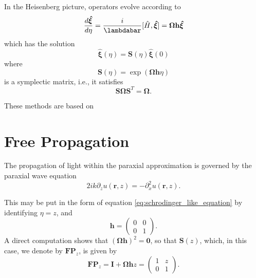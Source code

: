 \documentclass[a4paper,10pt]{report}
\begin{document}
In the Heisenberg picture, operators evolve according to
\begin{equation}
\frac{d\boldsymbol{\hat{\xi}}}{d\eta} = \frac{i}{\lambdabar} [\hat{H}, \boldsymbol{\hat{\xi}}] = \boldsymbol{\Omega} \mathbf{h} \boldsymbol{\hat{\xi}}
\end{equation}
which has the solution
\begin{equation}
\boldsymbol{\hat{\xi}}(\eta) = \mathbf{S}(\eta) \boldsymbol{\hat{\xi}}(0)
\end{equation}
where
\begin{equation}\mathbf{S}(\eta) = \exp(\boldsymbol{\Omega} \mathbf{h} \eta)\end{equation}
is a symplectic matrix, i.e., it satisfies
\begin{equation}\mathbf{S}\boldsymbol{\Omega} \mathbf{S}^T = \boldsymbol{\Omega}.\end{equation}

These methods are based on \cite{Stoler:81,Nazarathy:82}

\section{Free Propagation}

The propagation of light within the paraxial approximation is governed by the paraxial wave equation
\begin{equation}
    2ik\partial_z u(\mathbf{r}, z) = -\partial_x^2 u(\mathbf{r}, z).
\end{equation}

This may be put in the form of equation \eqref{eq:schrodinger_like_equation} by identifying $\eta = z$, and
\begin{equation}
    \mathbf{h} = \begin{pmatrix}
        0 & 0 \\
        0 & 1
    \end{pmatrix} .
\end{equation}
A direct computation shows that $(\boldsymbol{\Omega}\mathbf{h})^2 = \boldsymbol{0}$, so that $\mathbf{S}(z)$, which, in this case, we denote by $\mathbf{FP}_z$, is given by
\begin{equation}
    \mathbf{FP}_z = \boldsymbol{I} + \boldsymbol{\Omega}\mathbf{h} z = \begin{pmatrix}
        1 & z \\
        0 & 1
    \end{pmatrix} .
\end{equation}
\end{document}
